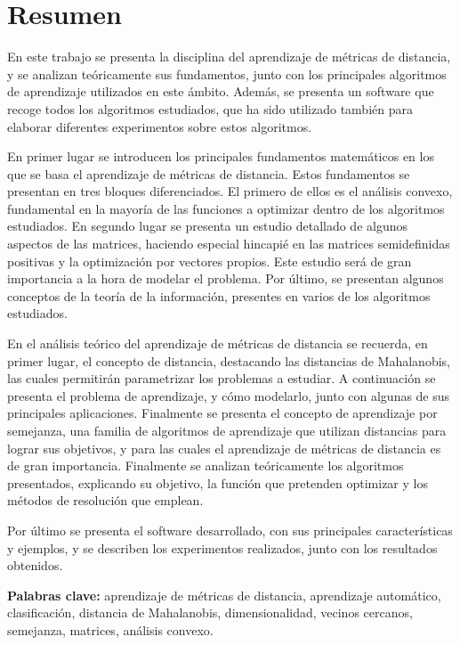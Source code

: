\chapter*{Resumen}

En este trabajo se presenta la disciplina del aprendizaje de métricas de distancia, y se analizan teóricamente sus fundamentos, junto con los principales algoritmos de aprendizaje utilizados en este ámbito. Además, se presenta un software que recoge todos los algoritmos estudiados, que ha sido utilizado también para elaborar diferentes experimentos sobre estos algoritmos.

En primer lugar se introducen los principales fundamentos matemáticos en los que se basa el aprendizaje de métricas de distancia. Estos fundamentos se presentan en tres bloques diferenciados. El primero de ellos es el análisis convexo, fundamental en la mayoría de las funciones a optimizar dentro de los algoritmos estudiados. En segundo lugar se presenta un estudio detallado de algunos aspectos de las matrices, haciendo especial hincapié en las matrices semidefinidas positivas y la optimización por vectores propios. Este estudio será de gran importancia a la hora de modelar el problema. Por último, se presentan algunos conceptos de la teoría de la información, presentes en varios de los algoritmos estudiados.

En el análisis teórico del aprendizaje de métricas de distancia se recuerda, en primer lugar, el concepto de distancia, destacando las distancias de Mahalanobis, las cuales permitirán parametrizar los problemas a estudiar. A continuación se presenta el problema de aprendizaje, y cómo modelarlo, junto con algunas de sus principales aplicaciones. Finalmente se presenta el concepto de aprendizaje por semejanza, una familia de algoritmos de aprendizaje que utilizan distancias para lograr sus objetivos, y para las cuales el aprendizaje de métricas de distancia es de gran importancia. Finalmente se analizan teóricamente los algoritmos presentados, explicando su objetivo, la función que pretenden optimizar y los métodos de resolución que emplean.

Por último se presenta el software desarrollado, con sus principales características y ejemplos, y se describen los experimentos realizados, junto con los resultados obtenidos.

\textbf{Palabras clave:} aprendizaje de métricas de distancia, aprendizaje automático, clasificación, distancia de Mahalanobis, dimensionalidad, vecinos cercanos, semejanza, matrices, análisis convexo.